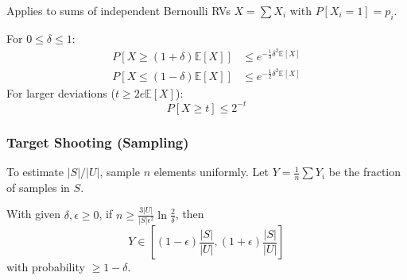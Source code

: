 Applies to sums of independent Bernoulli RVs $X = \sum X_i$ with $P[X_i=1]=p_i$.
\begin{theorem}
    For $0 \leq \delta \leq 1$:
    \begin{align*}
        P[X \geq (1+\delta)\mathbb{E}[X]] &\leq e^{-\frac{1}{3}\delta^2\mathbb{E}[X]} \\
        P[X \leq (1-\delta)\mathbb{E}[X]] &\leq e^{-\frac{1}{2}\delta^2\mathbb{E}[X]}
    \end{align*}
    For larger deviations ($t \geq 2 e \mathbb{E}[X]$):
    $$P[X \geq t] \leq 2^{-t}$$
\end{theorem}

\subsubsection{Target Shooting (Sampling)}
To estimate $|S|/|U|$, sample $n$ elements uniformly. Let $Y = \frac{1}{n} \sum Y_i$ be the fraction of samples in $S$.
\begin{theorem}
    With given $\delta, \epsilon \ge 0$, if $n \geq \frac{3 |U|}{|S| \epsilon^2} \ln \frac{2}{\delta}$, then 
    $$Y \in \left[(1-\epsilon)\frac{|S|}{|U|}, (1+\epsilon)\frac{|S|}{|U|}\right]$$
    with probability $\ge 1-\delta$.
\end{theorem}
